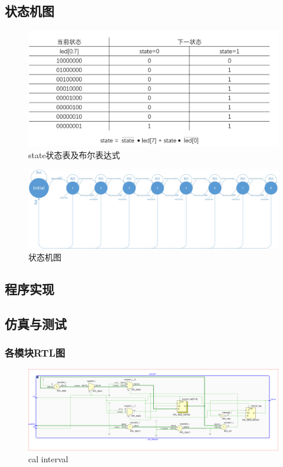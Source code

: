 \documentclass[UTF8]{article}
\begin{document}
\subsection{状态机图}

\begin{figure}[htbp]
    \centering
    \includegraphics[scale=0.6]{state状态表及布尔表达式.PNG}
    \caption{state状态表及布尔表达式}
\end{figure}

\begin{center}  
\begin{figure}[htbp]
    \includegraphics[scale=0.25]{状态机图.jpg}
    \caption{状态机图}
\end{figure}
\end{center}
\subsection{程序实现}


\subsection{仿真与测试}
\subsubsection{各模块RTL图}
\begin{figure}[htbp]
    \centering
    \includegraphics[scale=0.45]{cal_interval.PNG}
    \caption{cal interval}
\end{figure}
\end{document}
